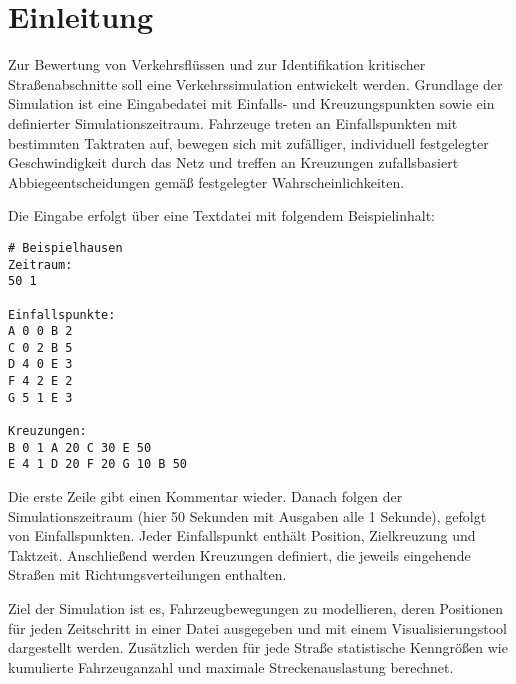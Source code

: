 \chapter{Einleitung}
Zur Bewertung von Verkehrsflüssen und zur Identifikation kritischer Straßenabschnitte soll eine Verkehrssimulation entwickelt werden.
Grundlage der Simulation ist eine Eingabedatei mit Einfalls- und Kreuzungspunkten sowie ein definierter Simulationszeitraum.
Fahrzeuge treten an Einfallspunkten mit bestimmten Taktraten auf, bewegen sich mit zufälliger,
individuell festgelegter Geschwindigkeit durch das Netz und treffen an Kreuzungen zufallsbasiert Abbiegeentscheidungen gemäß festgelegter Wahrscheinlichkeiten.

Die Eingabe erfolgt über eine Textdatei mit folgendem Beispielinhalt:

\begin{lstlisting}
# Beispielhausen
Zeitraum:
50 1

Einfallspunkte:
A 0 0 B 2
C 0 2 B 5
D 4 0 E 3
F 4 2 E 2
G 5 1 E 3

Kreuzungen:
B 0 1 A 20 C 30 E 50
E 4 1 D 20 F 20 G 10 B 50
\end{lstlisting}

Die erste Zeile gibt einen Kommentar wieder.
Danach folgen der Simulationszeitraum (hier 50 Sekunden mit Ausgaben alle 1 Sekunde),
gefolgt von Einfallspunkten. Jeder Einfallspunkt enthält Position, Zielkreuzung und Taktzeit.
Anschließend werden Kreuzungen definiert,
die jeweils eingehende Straßen mit Richtungsverteilungen enthalten.

Ziel der Simulation ist es, Fahrzeugbewegungen zu modellieren,
deren Positionen für jeden Zeitschritt in einer Datei ausgegeben und mit einem Visualisierungstool dargestellt werden.
Zusätzlich werden für jede Straße statistische Kenngrößen wie kumulierte Fahrzeuganzahl und maximale Streckenauslastung berechnet.